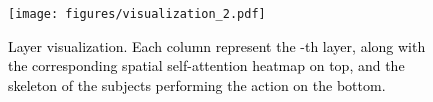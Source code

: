 \documentclass[times,twocolumn,final,authoryear]{elsarticle}
\DeclareRobustCommand{\new}[1]
{{\textcolor{black}{#1}}}
\begin{document}
 \begin{figure}[t]
    \centering
    \texttt{[image: figures/visualization\_2.pdf]}
    \caption{\new{Layer visualization. Each column represent the -th layer, along with the corresponding spatial self-attention heatmap on top, and the skeleton of the subjects performing the action on the bottom.}}
    \label{fig:layers}
\end{figure}







\end{document}
